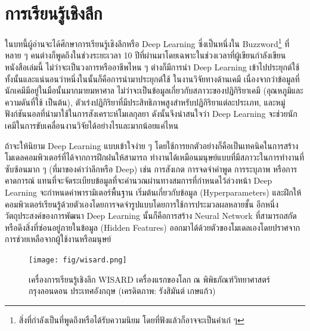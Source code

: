 

\chapter{การเรียนรู้เชิงลึก}
\label{ch:deep_learning}

ในบทนี้ผู้อ่านจะได้ศึกษาการเรียนรู้เชิงลึกหรือ Deep Learning ซึ่งเป็นหนึ่งใน Buzzword\footnote{สิ่งที่กำลังเป็นที่พูดถึงหรือได้รับความนิยม
    โดยที่ฟังแล้วก็อาจจะเป็นคำเก๋ ๆ} ที่หลาย ๆ คนต่างก็พูดถึงในช่วงระยะเวลา 10 ปีที่ผ่านมาโดยเฉพาะในช่วงเวลาที่ผู้เขียนกำลังเขียนหนังสือเล่มนี้
ไม่ว่าจะเป็นวงการหรืออาชีพไหน ๆ ต่างก็มีการนำ Deep Learning เข้าไปประยุกต์ใช้ทั้งนั้นและแน่นอนว่าหนึ่งในนั้นก็คือการนำมาประยุกต์ใช้%
ในงานวิจัยทางด้านเคมี เนื่องจากว่าข้อมูลที่นักเคมีมีอยู่ในมือนั้นมากมายมหาศาล ไม่ว่าจะเป็นข้อมูลเกี่ยวกับสภาวะของปฏิกิริยาเคมี (อุณหภูมิและ%
ความดันที่ใช้ เป็นต้น), ตัวเร่งปฏิกิริยาที่มีประสิทธิภาพสูงสำหรับปฏิกิริยาแต่ละประเภท, และหมู่ฟังก์ชันนอลที่นำมาใช้ในการสังเคราะห์โมเลกุลยา
ดังนั้นจึงน่าสนใจว่า Deep Learning จะช่วยนักเคมีในการขับเคลื่อนงานวิจัยได้อย่างไรและมากน้อยแค่ไหน

ถ้าจะให้นิยาม Deep Learning แบบเข้าใจง่าย ๆ โดยใช้การยกตัวอย่างก็คือเป็นเทคนิคในการสร้างโมเดลคอมพิวเตอร์ที่ได้จากการฝึกฝนให้สามารถ%
ทำงานได้เหมือนมนุษย์แบบที่มีสภาวะในการทำงานที่ซับซ้อนมาก ๆ (ที่มาของคำว่าลึกหรือ Deep) เช่น การสังเกต การจดจำคำพูด การระบุภาพ
หรือการคาดการณ์ แทนที่จะจัดระเบียบข้อมูลที่จะคำนวณผ่านทางสมการที่กำหนดไว้ล่วงหน้า Deep Learning จะกำหนดค่าพารามิเตอร์พื้นฐาน%
เริ่มต้นเกี่ยวกับข้อมูล (Hyperparameters) และฝึกให้คอมพิวเตอร์เรียนรู้ด้วยตัวเองโดยการจดจำรูปแบบโดยการใช้การประมวลผลหลายชั้น
อีกหนึ่งวัตถุประสงค์ของการพัฒนา Deep Learning นั้นก็คือการสร้าง Neural Network ที่สามารถสกัดหรือดึงสิ่งที่ซ่อนอยู่ภายในข้อมูล (Hidden
Features) ออกมาได้ด้วยตัวของโมเดลเองโดยปราศจากการช่วยเหลือจากผู้ใช้งานหรือมนุษย์

\begin{figure}[H]
    \centering
    \texttt{[image: fig/wisard.png]}
    \caption{เครื่องการเรียนรู้เชิงลึก WISARD เครื่องแรกของโลก ณ พิพิธภัณฑ์วิทยาศาสตร์ กรุงลอนดอน ประเทศอังกฤษ
        (เครดิตภาพ: รังสิมันต์ เกษแก้ว)}
    \label{fig:wisard}
\end{figure}

